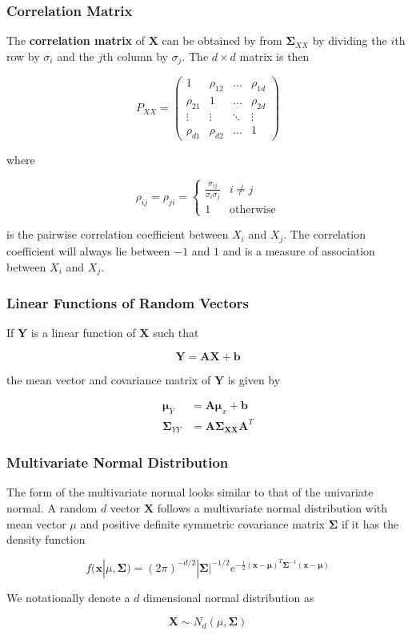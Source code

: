 \documentclass{beamer}
\begin{document}
\begin{frame}
\frametitle{Correlation Matrix}
The \textbf{correlation matrix} of $\mathbf{X}$ can be obtained by from $\mathbf{\Sigma}_{XX}$ by dividing the $i$th row by $\sigma_i$ and the $j$th column by $\sigma_j$.  The $d \times d$ matrix is then

$$P_{XX} = \begin{pmatrix}
    1 & \rho_{12} & \dots  & \rho_{1d}\\
    \rho_{21} & 1  & \dots  & \rho_{2d}\\
    \vdots & \vdots  & \ddots & \vdots \\
    \rho_{d1} & \rho_{d2}  & \dots  & 1
\end{pmatrix}$$

where 

$$\rho_{ij} = \rho_{ji} = \begin{cases}
\frac{\sigma_{ij}}{\sigma_i \sigma_j} & i \neq j\\
1 & \text{otherwise}
\end{cases}
$$

is the pairwise correlation coefficient between $X_i$ and $X_j$.  The correlation coefficient will always lie between $-1$ and $1$ and is a measure of association between $X_i$ and $X_j$.
\end{frame}

\begin{frame}
\frametitle{Linear Functions of Random Vectors}
If $\mathbf{Y}$ is a linear function of $\mathbf{X}$ such that

$$\mathbf{Y} = \mathbf{AX} + \mathbf{b}$$

the mean vector and covariance matrix of $\mathbf{Y}$ is given by

\begin{align*}
\mathbf{\mu}_Y &= \mathbf{A\mu}_x + \mathbf{b}\\
\mathbf{\Sigma}_{YY} &= \mathbf{A\Sigma_{XX}A}^T
\end{align*}
\end{frame}

\begin{frame}
\frametitle{Multivariate Normal Distribution}
The form of the multivariate normal looks similar to that of the univariate normal.  A random $d$ vector $\mathbf{X}$ follows a multivariate normal distribution with mean vector $\mu$ and positive definite symmetric covariance matrix $\mathbf{\Sigma}$ if it has the density function

$$f(\mathbf{x}|\mu, \mathbf{\Sigma}) = (2\pi)^{-d/2}|\mathbf{\Sigma}|^{-1/2} e^{-\frac{1}{2} (\mathbf{x} - \mathbf{\mu})^T \mathbf{\Sigma}^{-1}(\mathbf{x} - \mathbf{\mu})}$$

We notationally denote a $d$ dimensional normal distribution as 

$$\mathbf{X} \sim N_d(\mu, \mathbf{\Sigma})$$
\end{frame}
\end{document}
